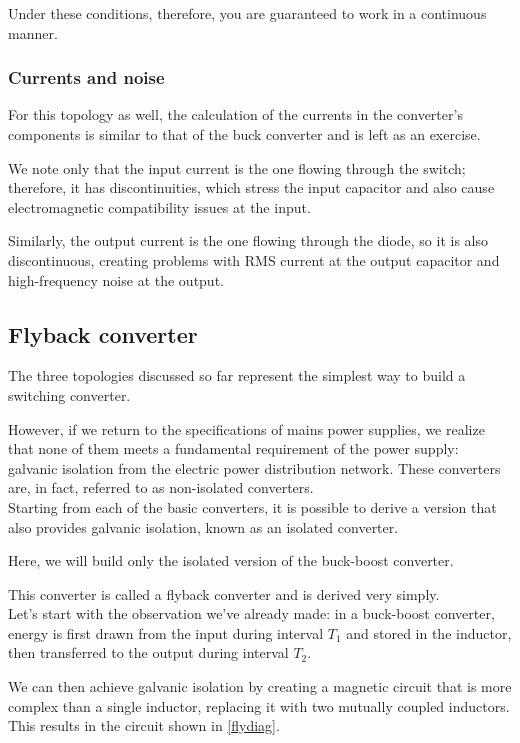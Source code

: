 \documentclass[../main.tex]{subfiles}
\begin{document}
Under these conditions, therefore, you are guaranteed to work in a continuous manner.

\subsubsection{Currents and noise}

For this topology as well, the calculation of the currents in the converter’s components is similar to that of the buck converter and is left as an exercise. 

We note only that the input current is the one flowing through the switch; therefore, it has discontinuities, which stress the input capacitor and also cause electromagnetic compatibility issues at the input. 

Similarly, the output current is the one flowing through the diode, so it is also discontinuous, creating problems with RMS current at the output capacitor and high-frequency noise at the output.


\subsection{Flyback converter}



The three topologies discussed so far represent the simplest way to build a switching converter. 

However, if we return to the specifications of mains power supplies, we realize that none of them meets a fundamental requirement of the power supply: galvanic isolation from the electric power distribution network. These converters are, in fact, referred to as non-isolated converters.\\


Starting from each of the basic converters, it is possible to derive a version that also provides galvanic isolation, known as an isolated converter. 

Here, we will build only the isolated version of the buck-boost converter. 

This converter is called a flyback converter and is derived very simply.\\

Let’s start with the observation we’ve already made: in a buck-boost converter, energy is first drawn from the input during interval $T_1$ and stored in the inductor, then transferred to the output during interval $T_2$.

We can then achieve galvanic isolation by creating a magnetic circuit that is more complex than a single inductor, replacing it with two mutually coupled inductors. This results in the circuit shown in \autoref{flydiag}.
\end{document}
